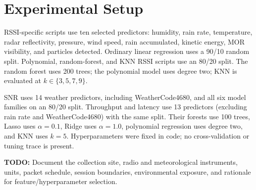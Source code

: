 \section{Experimental Setup}
RSSI-specific scripts use ten selected predictors: humidity, rain rate, temperature, radar reflectivity, pressure, wind speed, rain accumulated, kinetic energy, MOR visibility, and particles detected. Ordinary linear regression uses a 90/10 random split. Polynomial, random-forest, and KNN RSSI scripts use an 80/20 split. The random forest uses 200 trees; the polynomial model uses degree two; KNN is evaluated at $k\in\{3,5,7,9\}$.

SNR uses 14 weather predictors, including WeatherCode4680, and all six model families on an 80/20 split. Throughput and latency use 13 predictors (excluding rain rate and WeatherCode4680) with the same split. Their forests use 100 trees, Lasso uses $\alpha=0.1$, Ridge uses $\alpha=1.0$, polynomial regression uses degree two, and KNN uses $k=5$. Hyperparameters were fixed in code; no cross-validation or tuning trace is present.

\textbf{TODO:} Document the collection site, radio and meteorological instruments, units, packet schedule, session boundaries, environmental exposure, and rationale for feature/hyperparameter selection.
